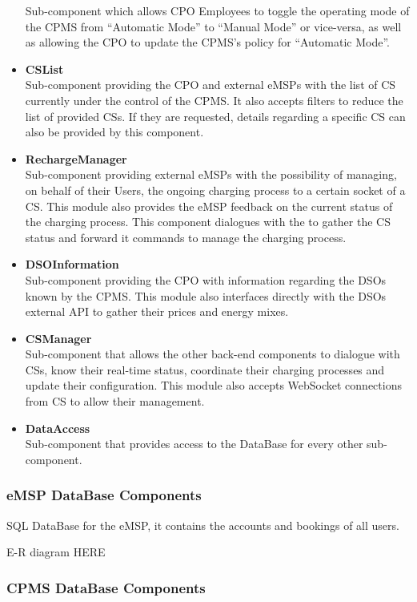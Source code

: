 \documentclass[11pt]{article}
\begin{document}
\begin{itemize}
        Sub-component which allows CPO Employees to toggle the operating mode of the CPMS from “Automatic Mode” to “Manual Mode” or vice-versa, as well as allowing the CPO to update the CPMS’s policy for “Automatic Mode”.
    \item \textbf{CSList} \\
        Sub-component providing the CPO and external eMSPs with the list of CS currently under the control of the CPMS. It also accepts filters to reduce the list of provided CSs. If they are requested, details regarding a specific CS can also be provided by this component.
    \item \textbf{RechargeManager} \\
        Sub-component providing external eMSPs with the possibility of managing, on behalf of their Users, the ongoing charging process to a certain socket of a CS. This module also provides the eMSP feedback on the current status of the charging process. This component dialogues with the  to gather the CS status and forward it commands to manage the charging process.  
    \item \textbf{DSOInformation} \\
        Sub-component providing the CPO with information regarding the DSOs known by the CPMS. This module also interfaces directly with the DSOs external API to gather their prices and energy mixes. 
    \item \textbf{CSManager} \\
        Sub-component that allows the other back-end components to dialogue with CSs, know their real-time status, coordinate their charging processes and update their configuration. This module also accepts WebSocket connections from CS to allow their management.
    \item \textbf{DataAccess} \\
        Sub-component that provides access to the DataBase for every other sub-component.
\end{itemize}

\subsubsection{eMSP DataBase Components}

SQL DataBase for the eMSP, it contains the accounts and bookings of all users.

E-R diagram HERE

\subsubsection{CPMS DataBase Components}
\end{document}
